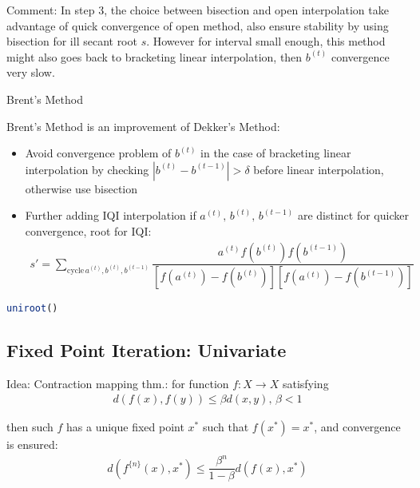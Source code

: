     Comment: In step 3, the choice between bisection and open interpolation take advantage of quick convergence of open method, also ensure stability by using bisection for ill secant root $ s $. However for interval small enough, this method might also goes back to bracketing linear interpolation, then $ b^{(t)} $ convergence very slow.
    

\begin{point}
    \hypertarget{Brent}{Brent's Method}
\end{point}

    Brent's Method is an improvement of Dekker's Method: 
\begin{itemize}[topsep=2pt,itemsep=0pt]
    \item Avoid convergence problem of $ b^{(t)} $ in the case of bracketing linear interpolation by checking $ |b^{(t)}-b^{(t-1)}|>\delta  $ before linear interpolation, otherwise use bisection
    \item Further adding IQI interpolation if $ a^{(t)},\,b^{(t)},\,b^{(t-1)} $ are distinct for quicker convergence, root for IQI:
    \begin{align}
        s'=\sum_{\mathrm{cycle}\,a^{(t)},b^{(t)},b^{(t-1)}}\dfrac{a^{(t)}f(b^{(t)})f(b^{(t-1)})}{\left[f(a^{(t)})-f(b^{(t)})\right]\left[f(a^{(t)})-f(b^{(t-1)})\right]}
    \end{align}

\end{itemize}

\begin{rcode}
\begin{lstlisting}[language=R]
uniroot()
\end{lstlisting}
\end{rcode}




\subsection{Fixed Point Iteration: Univariate}
\hypertarget{FixedPoint}{}
    Idea: Contraction mapping thm.: for function $ f:X\to X $ satisfying
    \begin{align}
        d(f(x),f(y))\leq \beta d(x,y),\, \beta <1 
    \end{align}
    
    then such $ f $ has a unique fixed point $ x^* $ such that $ f(x^*)=x^* $, and convergence is ensured:
    \begin{align}
        d(f^{\{n\}}(x),x^*)\leq \dfrac{\beta ^n}{1-\beta }d(f(x),x^*) 
    \end{align}
    

